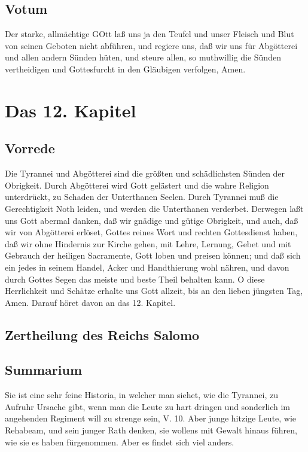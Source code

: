 \section{Votum}

Der starke, allmächtige GOtt laß uns ja den Teufel und unser Fleisch und Blut von seinen Geboten nicht abführen, und regiere uns, daß wir uns für Abgötterei und allen andern Sünden hüten, und steure allen, so muthwillig die Sünden vertheidigen und Gottesfurcht in den Gläubigen verfolgen, Amen.

\chapter{Das 12. Kapitel}

\section{Vorrede}

Die Tyrannei und Abgötterei sind die größten und schädlichsten Sünden der Obrigkeit. Durch Abgötterei wird Gott gelästert und die wahre Religion unterdrückt, zu Schaden der Unterthanen Seelen. Durch Tyrannei muß die Gerechtigkeit Noth leiden, und werden die Unterthanen verderbet. Derwegen laßt uns Gott abermal danken, daß wir gnädige und gütige Obrigkeit, und auch, daß wir von Abgötterei erlöset, Gottes reines Wort und rechten Gottesdienst haben, daß wir ohne Hindernis zur Kirche gehen, mit Lehre, Lernung, Gebet und mit Gebrauch der heiligen Sacramente, Gott loben und preisen können; und daß sich ein jedes in seinem Handel, Acker und Handthierung wohl nähren, und davon durch Gottes Segen das meiste und beste Theil behalten kann. O diese Herrlichkeit und Schätze erhalte uns Gott allzeit, bis an den lieben jüngsten Tag, Amen. Darauf höret davon an das 12. Kapitel.

\section{Zertheilung des Reichs Salomo}

\section{Summarium}

Sie ist eine sehr feine Historia, in welcher man siehet, wie die Tyrannei, zu Aufruhr Ursache gibt, wenn man die Leute zu hart dringen und sonderlich im angehenden Regiment will zu strenge sein, V. 10. Aber junge hitzige Leute, wie Rehabeam, und sein junger Rath denken, sie wollens mit Gewalt hinaus führen, wie sie es haben fürgenommen. Aber es findet sich viel anders.

